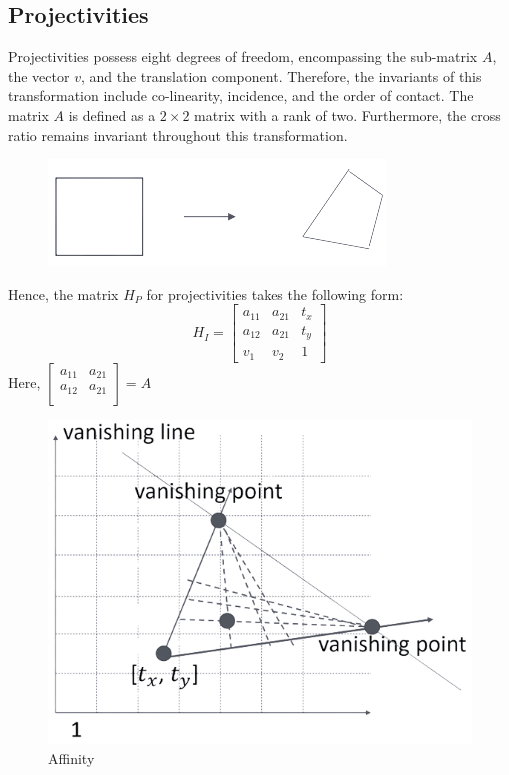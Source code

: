 \subsection{Projectivities}
Projectivities possess eight degrees of freedom, encompassing the sub-matrix $A$, the vector $v$, and the translation component. 
Therefore, the invariants of this transformation include co-linearity, incidence, and the order of contact.
The matrix $A$ is defined as a $2 \times 2$ matrix with a rank of two. 
Furthermore, the cross ratio remains invariant throughout this transformation.
\begin{figure}[H]
    \centering
    \includegraphics[width=0.25\linewidth]{images/projectivities.png}
\end{figure}
Hence, the matrix $H_P$ for projectivities takes the following form:
\[H_I=
\begin{bmatrix}
    a_{11} & a_{21} & t_x \\
    a_{12} & a_{21} & t_y \\
    v_1 & v_2 & 1
\end{bmatrix}\]
Here, $
\begin{bmatrix}
    a_{11} & a_{21} \\
    a_{12} & a_{21} \\
\end{bmatrix}
=A$
\begin{figure}[H]
    \centering
    \includegraphics[width=0.25\linewidth]{images/projectivities1.png}
    \caption{Affinity}
\end{figure}